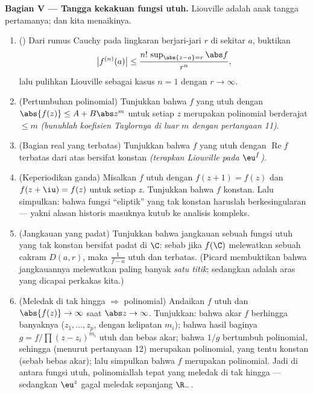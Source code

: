 \begin{problem}
\medskip
\noindent\textbf{Bagian V --- Tangga kekakuan fungsi
utuh.} Liouville adalah anak tangga pertamanya; dan kita
menaikinya.
\begin{enumerate}[resume]
  \item () Dari rumus Cauchy pada
        lingkaran berjari-jari $r$ di sekitar $a$, buktikan
        \[
        \bigl|f^{(n)}(a)\bigr| \leq
        \frac{n!\,\sup_{\abs{z-a}=r}\abs f}{r^n} ,
        \]
        lalu pulihkan Liouville sebagai kasus $n = 1$ dengan $r \to
        \infty$.
  \item (Pertumbuhan polinomial) Tunjukkan bahwa $f$ yang utuh dengan
        $\abs{f(z)} \leq A + B\abs z^m$ untuk setiap $z$ merupakan
        polinomial berderajat $\leq m$ \emph{(bunuhlah koefisien
        Taylornya di luar $m$ dengan pertanyaan 11)}.
  \item (Bagian real yang terbatas) Tunjukkan bahwa $f$ yang utuh dengan
        $\operatorname{Re}f$ terbatas dari atas bersifat konstan
        \emph{(terapkan Liouville pada $\eu^{f}$)}.
  \item (Keperiodikan ganda) Misalkan $f$ utuh dengan $f(z + 1)
        = f(z)$ dan $f(z + \iu) = f(z)$ untuk setiap $z$. Tunjukkan bahwa $f$
        konstan. Lalu simpulkan: bahwa fungsi ``eliptik'' yang tak konstan
        haruslah berkesingularan --- yakni alasan historis
        masuknya kutub ke analisis kompleks.
  \item (Jangkauan yang padat) Tunjukkan bahwa jangkauan sebuah fungsi utuh
        yang tak konstan bersifat padat di $\C$: sebab jika $f(\C)$ melewatkan sebuah
        cakram $D(a, r)$, maka $\frac1{f - a}$ utuh dan
        terbatas. (Picard membuktikan bahwa jangkauannya melewatkan paling banyak
        \emph{satu titik}; sedangkan  adalah aras yang dicapai perkakas kita.)
  \item (Meledak di tak hingga $\Rightarrow$ polinomial) Andaikan $f$
        utuh dan $\abs{f(z)} \to \infty$ saat $\abs z \to
        \infty$. Tunjukkan: bahwa akar $f$ berhingga banyaknya
        ($z_1, \dots, z_p$, dengan kelipatan $m_i$); bahwa
        hasil baginya $g = f/\prod(z - z_i)^{m_i}$ utuh dan
        bebas akar; bahwa $1/g$ bertumbuh polinomial, sehingga
        (menurut pertanyaan 12) merupakan polinomial, yang tentu konstan
        (sebab bebas akar); lalu simpulkan bahwa $f$ merupakan polinomial. Jadi
        di antara fungsi utuh, polinomiallah tepat yang
        meledak di tak hingga --- sedangkan $\eu^z$ gagal meledak sepanjang
        $\R_-$.
\end{enumerate}


\end{problem}
